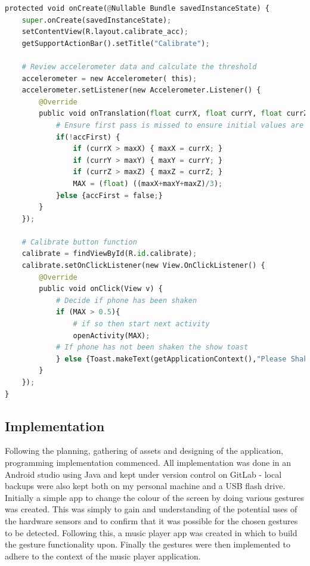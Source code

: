 \documentclass{l4proj}
\begin{document}
\begin{lstlisting}[language=python, float, caption={Java Code used to implement the Calibration stage on opening the application. Showing how the shake gesture threshold is calculated and how this step is enforced.}, label=lst:Calibrator]
protected void onCreate(@Nullable Bundle savedInstanceState) {
    super.onCreate(savedInstanceState);
    setContentView(R.layout.calibrate_acc);
    getSupportActionBar().setTitle("Calibrate");

    # Review accelerometer data and calculate the threshold
    accelerometer = new Accelerometer( this);
    accelerometer.setListener(new Accelerometer.Listener() {
        @Override
        public void onTranslation(float currX, float currY, float currZ) {
            # Ensure first pass is missed to ensure initial values are not compared
            if(!accFirst) {
                if (currX > maxX) { maxX = currX; }
                if (currY > maxY) { maxY = currY; }
                if (currZ > maxZ) { maxZ = currZ; }
                MAX = (float) ((maxX+maxY+maxZ)/3);
            }else {accFirst = false;}
        }
    });

    # Calibrate button function
    calibrate = findViewById(R.id.calibrate);
    calibrate.setOnClickListener(new View.OnClickListener() {
        @Override
        public void onClick(View v) {
            # Decide if phone has been shaken
            if (MAX > 0.5){
                # if so then start next activity
                openActivity(MAX);
            # If phone has not been shaken the show toast 
            } else {Toast.makeText(getApplicationContext(),"Please Shake",Toast.LENGTH_SHORT).show();}
        }
    });
}
\end{lstlisting}

\subsection{Implementation}

Following the planning, gathering of assets and designing of the application, programming implementation commenced. All implementation was done in an Android studio using Java and kept under version control on GitLab - local backups were also kept both on my personal machine and a USB flash drive. Initially a simple app to change the colour of the screen by doing various gestures was created. This was simply to gain and understanding of the potential uses of the hardware sensors and to confirm that it was possible for the chosen gestures to be detected. Following this, a music player app was created in which to build the gesture functionality upon. Finally the gestures were then implemented to adhere to the context of the music player application.
\end{document}
